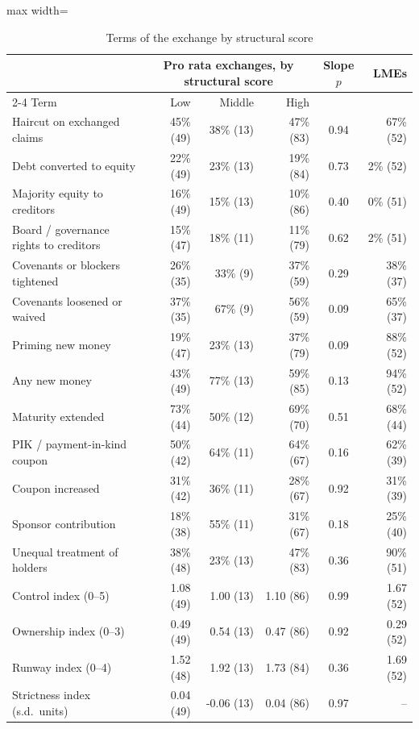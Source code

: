 \begin{table}[htbp]\centering
\caption{Terms of the exchange by structural score}
\label{tab:terms}
\small
\begin{adjustbox}{max width=\textwidth}
\begin{tabular}{l rrr c r}
\toprule
 & \multicolumn{3}{c}{Pro rata exchanges, by structural score} & Slope $p$ & LMEs \\
 \cmidrule(lr){2-4}
Term & Low & Middle & High &  &  \\
\midrule
Haircut on exchanged claims & 45\% (49) & 38\% (13) & 47\% (83) & 0.94 & 67\% (52) \\
Debt converted to equity & 22\% (49) & 23\% (13) & 19\% (84) & 0.73 & 2\% (52) \\
Majority equity to creditors & 16\% (49) & 15\% (13) & 10\% (86) & 0.40 & 0\% (51) \\
Board / governance rights to creditors & 15\% (47) & 18\% (11) & 11\% (79) & 0.62 & 2\% (51) \\
Covenants or blockers tightened & 26\% (35) & 33\% (9) & 37\% (59) & 0.29 & 38\% (37) \\
Covenants loosened or waived & 37\% (35) & 67\% (9) & 56\% (59) & 0.09 & 65\% (37) \\
Priming new money & 19\% (47) & 23\% (13) & 37\% (79) & 0.09 & 88\% (52) \\
Any new money & 43\% (49) & 77\% (13) & 59\% (85) & 0.13 & 94\% (52) \\
Maturity extended & 73\% (44) & 50\% (12) & 69\% (70) & 0.51 & 68\% (44) \\
PIK / payment-in-kind coupon & 50\% (42) & 64\% (11) & 64\% (67) & 0.16 & 62\% (39) \\
Coupon increased & 31\% (42) & 36\% (11) & 28\% (67) & 0.92 & 31\% (39) \\
Sponsor contribution & 18\% (38) & 55\% (11) & 31\% (67) & 0.18 & 25\% (40) \\
Unequal treatment of holders & 38\% (48) & 23\% (13) & 47\% (83) & 0.36 & 90\% (51) \\
\midrule
Control index (0--5) & 1.08 (49) & 1.00 (13) & 1.10 (86) & 0.99 & 1.67 (52) \\
Ownership index (0--3) & 0.49 (49) & 0.54 (13) & 0.47 (86) & 0.92 & 0.29 (52) \\
Runway index (0--4) & 1.52 (48) & 1.92 (13) & 1.73 (84) & 0.36 & 1.69 (52) \\
Strictness index (s.d.\ units) & 0.04 (49) & -0.06 (13) & 0.04 (86) & 0.97 & -- \\

\end{tabular}
\end{adjustbox}
\end{table}
